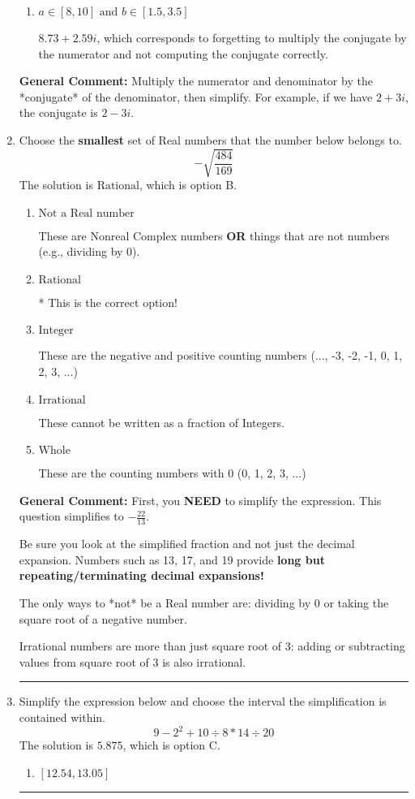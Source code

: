 \documentclass{extbook}[14pt]
\newcommand{\litem}[1]{\item #1

\rule{\textwidth}{0.4pt}}
\begin{document}
\begin{enumerate}
{\begin{enumerate}[label=\Alph*.]
 $182.00  - 7.95 i$, which corresponds to forgetting to multiply the conjugate by the numerator and using a plus instead of a minus in the denominator.
\item \( a \in [8, 10] \text{ and } b \in [1.5, 3.5] \)

 $8.73  + 2.59 i$, which corresponds to forgetting to multiply the conjugate by the numerator and not computing the conjugate correctly.
\end{enumerate}

\textbf{General Comment:} Multiply the numerator and denominator by the *conjugate* of the denominator, then simplify. For example, if we have $2+3i$, the conjugate is $2-3i$.
}
\litem{
Choose the \textbf{smallest} set of Real numbers that the number below belongs to.
\[ -\sqrt{\frac{484}{169}} \]The solution is \( \text{Rational} \), which is option B.\begin{enumerate}[label=\Alph*.]
\item \( \text{Not a Real number} \)

These are Nonreal Complex numbers \textbf{OR} things that are not numbers (e.g., dividing by 0).
\item \( \text{Rational} \)

* This is the correct option!
\item \( \text{Integer} \)

These are the negative and positive counting numbers (..., -3, -2, -1, 0, 1, 2, 3, ...)
\item \( \text{Irrational} \)

These cannot be written as a fraction of Integers.
\item \( \text{Whole} \)

These are the counting numbers with 0 (0, 1, 2, 3, ...)
\end{enumerate}

\textbf{General Comment:} First, you \textbf{NEED} to simplify the expression. This question simplifies to $-\frac{22}{13}$. 
 
 Be sure you look at the simplified fraction and not just the decimal expansion. Numbers such as 13, 17, and 19 provide \textbf{long but repeating/terminating decimal expansions!} 
 
 The only ways to *not* be a Real number are: dividing by 0 or taking the square root of a negative number. 
 
 Irrational numbers are more than just square root of 3: adding or subtracting values from square root of 3 is also irrational.
}
\litem{
Simplify the expression below and choose the interval the simplification is contained within.
\[ 9 - 2^2 + 10 \div 8 * 14 \div 20 \]The solution is \( 5.875 \), which is option C.\begin{enumerate}[label=\Alph*.]
\item \( [12.54, 13.05] \)


\end{enumerate}}
\end{enumerate}
\end{document}
